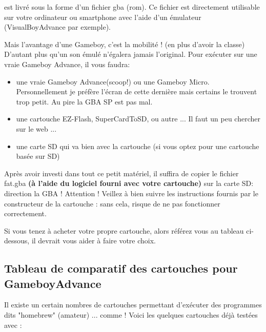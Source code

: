 \FAT est livré sous la forme d'un fichier gba (rom).
Ce fichier est directement utilisable sur votre ordinateur ou smartphone avec l'aide d'un émulateur (VisualBoyAdvance par exemple).
\medskip

Mais l'avantage d'une Gameboy, c'est la mobilité ! (en plus d'avoir la classe)
D'autant plus qu'un son émulé n'égalera jamais l'original.
Pour exécuter \FAT sur une vraie Gameboy Advance, il vous faudra:
\begin{itemize}
  \item{une vraie Gameboy Advance(scoop!) ou une Gameboy Micro. Personnellement je préfère l'écran de cette dernière mais certains le trouvent trop petit. Au pire la GBA SP est pas mal.}
  \item{une cartouche EZ-Flash, SuperCardToSD, ou autre ... Il faut un peu chercher sur le web ...}
  \item{une carte SD qui va bien avec la cartouche (si vous optez pour une cartouche basée sur SD)}
\end{itemize}\medskip

Après avoir investi dans tout ce petit matériel, il suffira de copier le fichier fat.gba {\bf (à l'aide du logiciel fourni avec votre cartouche)} sur la carte SD: direction la GBA !
Attention ! Veillez à bien suivre les instructions fournis par le constructeur de la cartouche : sans cela, \FAT risque de ne pas fonctionner correctement.


Si vous tenez à acheter votre propre cartouche, alors référez vous au tableau ci-dessous, il devrait vous aider à faire votre choix.

\subsection{Tableau de comparatif des cartouches pour GameboyAdvance}

Il existe un certain nombres de cartouches permettant d'exécuter des programmes dits "homebrew" (amateur) ... comme \FAT !
Voici les quelques cartouches déjà testées avec \FAT :
\medskip

